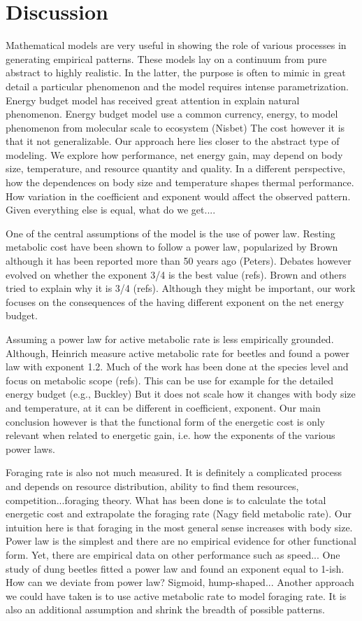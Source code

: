 \section*{Discussion}
Mathematical models are very useful in showing the role of various processes in generating empirical patterns.
These models lay on a continuum from pure abstract to highly realistic.
In the latter, the purpose is often to mimic in great detail a particular phenomenon and the model requires intense parametrization.
Energy budget model has received great attention in explain natural phenomenon.
Energy budget model use a common currency, energy, to model phenomenon from molecular scale to ecosystem (Nisbet)
The cost however it is that it not generalizable.
Our approach here lies closer to the abstract type of modeling.
We explore how performance, net energy gain, may depend on body size, temperature, and resource quantity and quality. 
In a different perspective, how the dependences on body size and temperature shapes thermal performance.
How variation in the coefficient and exponent would affect the observed pattern.
Given everything else is equal, what do we get....

One of the central assumptions of the model is the use of power law.
Resting metabolic cost have been shown to follow a power law, popularized by Brown although it has been reported more than 50 years ago (Peters).
Debates however evolved on whether the exponent 3/4 is the best value (refs).
Brown and others tried to explain why it is 3/4 (refs).
Although they might be important, our work focuses on the consequences of the having different exponent on the net energy budget. 

Assuming a power law for active metabolic rate is less empirically grounded.
Although, Heinrich measure active metabolic rate for beetles and found a power law with exponent 1.2.
Much of the work has been done at the  species level and focus on metabolic scope (refs).
This can be use for example for the detailed energy budget (e.g., Buckley)
But it does not scale how it changes with body size and temperature, at it can be different in coefficient, exponent.
Our main conclusion however is that the functional form of the energetic cost is only relevant when related to energetic gain, i.e. how the exponents of the various power laws.  
 
Foraging rate is also not much measured.
It is definitely a complicated process and depends on resource distribution, ability to find them resources, competition...foraging theory.
What has been done is to calculate the total energetic cost and extrapolate the foraging rate (Nagy field metabolic rate).
Our intuition here is that foraging in the most general sense increases with body size.
Power law is the simplest and there are no empirical evidence for other functional form.
Yet, there are empirical data on other performance such as speed...
One study of dung beetles fitted a power law and found an exponent equal to 1-ish.
How can we deviate from power law? 
Sigmoid, hump-shaped...
Another approach we could have taken is to use active metabolic rate to model foraging rate.
It is also an additional assumption and shrink the breadth of possible patterns.

